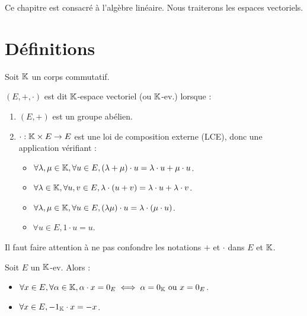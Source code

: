 \documentclass[12pt, a4paper]{report}
\begin{document}

\tableofcontents
\clearpage

\vspace*{\fill}
Ce chapitre est consacré à l'algèbre linéaire. Nous traiterons les espaces vectoriels.
\vspace*{\fill}

\chapter{Définitions}

\begin{definition}
    Soit $\mathbb{K}$ un corps commutatif.

    $(E,+,\cdot)$ est dit $\mathbb{K}$-espace vectoriel (ou $\mathbb{K}$-ev.) lorsque :
    \begin{enumerate}
        \item $(E,+)$ est un groupe abélien.
        \item $\cdot : \mathbb{K} \times E \to E$ est une loi de composition externe (LCE), donc une application vérifiant :
        \begin{itemize}
            \item $\forall \lambda, \mu \in \mathbb{K}, \forall u \in E, (\lambda + \mu) \cdot u = \lambda \cdot u + \mu \cdot u$.
            \item $\forall \lambda \in \mathbb{K}, \forall u, v \in E, \lambda \cdot (u + v) = \lambda \cdot u + \lambda \cdot v$.
            \item $\forall \lambda, \mu \in \mathbb{K}, \forall u \in E, (\lambda\mu) \cdot u = \lambda\cdot(\mu\cdot u)$.
            \item $\forall u\in E, 1\cdot u = u$.
        \end{itemize}
    \end{enumerate}
\end{definition}

\begin{attention}
    Il faut faire attention à ne pas confondre les notations $+$ et $\cdot$ dans $E$ et $\mathbb{K}$.
\end{attention}

\begin{property}
    Soit $E$ un $\mathbb{K}$-ev. Alors :
    \begin{itemize}
        \item $\forall x \in E, \forall \alpha \in \mathbb{K}, \alpha \cdot x = 0_E \iff \alpha = 0_{\mathbb{K}} \text{ ou } x = 0_E$.
        \item $\forall x \in E, -1_{\mathbb{K}} \cdot x = -x$.
    \end{itemize}
\end{property}
\end{document}
